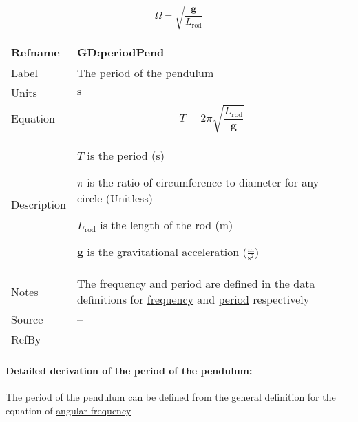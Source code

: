 \documentclass[12pt]{article}
\begin{document}
\begin{displaymath}
Ω=\sqrt{\frac{\symbf{g}}{{L_{\text{rod}}}}}
\end{displaymath}
\vspace{\baselineskip}
\noindent
\begin{minipage}{\textwidth}
\begin{tabular}{>{\raggedright}p{}>{\raggedright\arraybackslash}p{}}
\toprule \textbf{Refname} & \textbf{GD:periodPend}
\label{GD:periodPend}
\\ \midrule
Label & The period of the pendulum
        
\\ \midrule
Units & ${\text{s}}$
        
\\ \midrule
Equation & \begin{displaymath}
           T=2 π \sqrt{\frac{{L_{\text{rod}}}}{\symbf{g}}}
           \end{displaymath}
\\ \midrule
Description & \begin{symbDescription}
              \item{$T$ is the period (${\text{s}}$)}
              \item{$π$ is the ratio of circumference to diameter for any circle (Unitless)}
              \item{${L_{\text{rod}}}$ is the length of the rod (${\text{m}}$)}
              \item{$\symbf{g}$ is the gravitational acceleration ($\frac{\text{m}}{\text{s}^{2}}$)}
              \end{symbDescription}
\\ \midrule
Notes & The frequency and period are defined in the data definitions for \hyperref[DD:frequencyDD]{frequency} and \hyperref[DD:periodSHMDD]{period} respectively
        
\\ \midrule
Source & --
         
\\ \midrule
RefBy & 
\\ \bottomrule
\end{tabular}
\end{minipage}
\paragraph{Detailed derivation of the period of the pendulum:}
\label{GD:periodPendDeriv}
The period of the pendulum can be defined from the general definition for the equation of \hyperref[GD:angFrequencyGD]{angular frequency}
\end{document}
